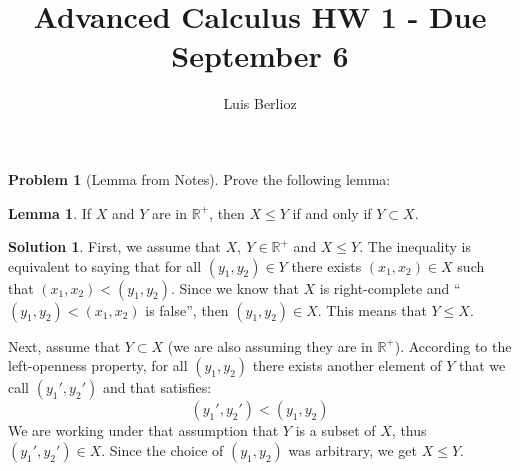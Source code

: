 \documentclass{article}
\theoremstyle{definition}
\newtheorem*{soln}{Solution}
\newtheorem*{prob}{Problem}
\newtheorem*{lemma}{Lemma}
\theoremstyle{theorem}
\newcommand{\R}{\mathbb{R}}
\begin{document}
\title{Advanced Calculus HW 1 - Due September 6}
\author{Luis Berlioz}
\maketitle



\begin{prob}[Lemma from Notes]
Prove the following lemma:
\begin{lemma}
If $X$ and $Y$ are in $\R^+$, then $X \leq Y$ if and only if $Y \subset X$.
\end{lemma}
\end{prob}
\begin{soln}
	First, we assume that $X,\ Y\in \R^+$ and $X\leq Y$. The inequality is equivalent to saying that for all $(y_1,y_2) \in Y$ there exists $(x_1,x_2) \in X$ such that $(x_1,x_2) < (y_1, y_2)$. Since we know that $X$ is right-complete and ``$(y_1, y_2)< (x_1,x_2)$ is false'', then $(y_1,y_2)\in X$. This means that $Y\leq X$.

	Next, assume that $Y\subset X$ (we are also assuming they are in $\R^+$). According to the left-openness property, for all $(y_1,y_2)$ there exists another element of $Y$ that we call $(y_1', y_2')$ and that satisfies:
	$$(y_1', y_2')<(y_1,y_2)$$
	We are working under that assumption that $Y$ is a subset of $X$, thus $(y_1', y_2')\in X$. Since the choice of $(y_1, y_2)$ was arbitrary, we get $X\leq Y$. 
\end{soln}
\vspace{1in}
\end{document}
